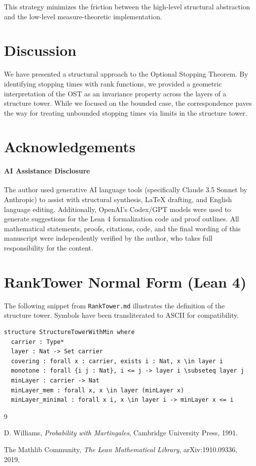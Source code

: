 \documentclass[11pt, a4paper]{article}
\theoremstyle{plain}
\theoremstyle{definition}
\theoremstyle{remark}
\begin{document}
This strategy minimizes the friction between the high-level structural abstraction and the low-level measure-theoretic implementation.

\section{Discussion} \label{sec:conclusion}

We have presented a structural approach to the Optional Stopping Theorem. By identifying stopping times with rank functions, we provided a geometric interpretation of the OST as an invariance property across the layers of a structure tower. While we focused on the bounded case, the correspondence paves the way for treating unbounded stopping times via limits in the structure tower.

\section*{Acknowledgements}

\paragraph{AI Assistance Disclosure}
The author used generative AI language tools (specifically Claude 3.5 Sonnet by Anthropic) to assist with structural synthesis, LaTeX drafting, and English language editing. Additionally, OpenAI's Codex/GPT models were used to generate suggestions for the Lean 4 formalization code and proof outlines. All mathematical statements, proofs, citations, code, and the final wording of this manuscript were independently verified by the author, who takes full responsibility for the content.

\appendix

\section{RankTower Normal Form (Lean 4)}
The following snippet from \texttt{RankTower.md} illustrates the definition of the structure tower. Symbols have been transliterated to ASCII for compatibility.

\begin{verbatim}
structure StructureTowerWithMin where
  carrier : Type*
  layer : Nat -> Set carrier
  covering : forall x : carrier, exists i : Nat, x \in layer i
  monotone : forall {i j : Nat}, i <= j -> layer i \subseteq layer j
  minLayer : carrier -> Nat
  minLayer_mem : forall x, x \in layer (minLayer x)
  minLayer_minimal : forall x i, x \in layer i -> minLayer x <= i
\end{verbatim}

\begin{thebibliography}{9}

D. Williams,
\textit{Probability with Martingales},
Cambridge University Press, 1991.

The Mathlib Community,
\textit{The Lean Mathematical Library},
arXiv:1910.09336, 2019.

\end{thebibliography}
\end{document}
